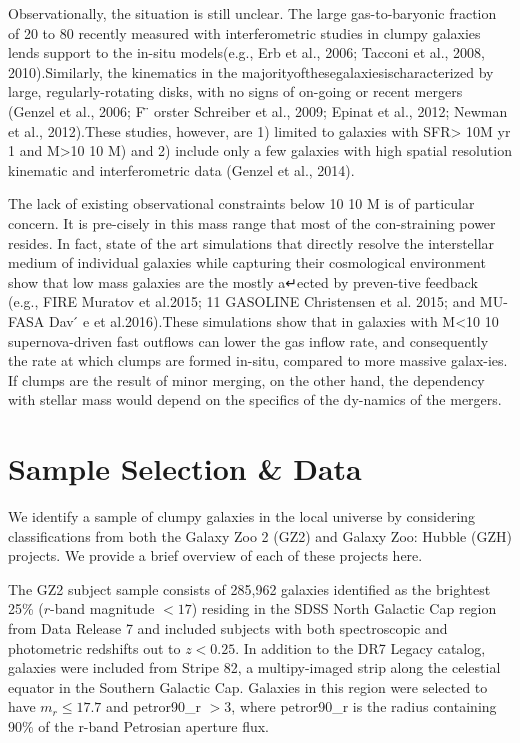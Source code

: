 Observationally, the situation is still unclear. The large gas-to-baryonic fraction of 20 to 80 recently measured with interferometric studies in clumpy galaxies lends support to the in-situ models(e.g., Erb et al., 2006; Tacconi et al., 2008, 2010).Similarly, the kinematics in the majorityofthesegalaxiesischaracterized by large, regularly-rotating disks, with no signs of on-going or recent mergers (Genzel et al., 2006; F ̈ orster Schreiber et al., 2009; Epinat et al., 2012; Newman et al., 2012).These studies, however, are 1) limited to galaxies with SFR> 10M yr 1 and M>10 10 M) and 2) include only a few galaxies with high spatial resolution kinematic and interferometric data (Genzel et al., 2014). 

The lack of existing observational constraints below 10 10 M is of particular concern. It is pre-cisely in this mass range that most of the con-straining power resides. In fact, state of the art simulations that directly resolve the interstellar medium of individual galaxies while capturing their cosmological environment show that low mass galaxies are the mostly a↵ected by preven-tive feedback (e.g., FIRE Muratov et al.2015; 11
GASOLINE Christensen et al. 2015; and MU-FASA Dav ́ e et al.2016).These simulations show that in galaxies with M<10 10 supernova-driven fast outflows can lower the gas inflow rate, and consequently the rate at which clumps are formed in-situ, compared to more massive galax-ies. If clumps are the result of minor merging, on the other hand, the dependency with stellar mass would depend on the specifics of the dy-namics of the mergers. 

\section{Sample Selection \& Data} \label{sec:chap5-sample}
We identify a sample of clumpy galaxies in the local universe by considering classifications from both the Galaxy Zoo 2 (GZ2) \citep{Willett2013} and Galaxy Zoo: Hubble (GZH) \citep{Willett2017} projects. We provide a brief overview of each of these projects here. 

The GZ2 subject sample consists of 285,962 galaxies identified as the brightest 25\% ($r$-band magnitude $< 17$) residing in the SDSS North Galactic Cap region from Data Release 7 and included subjects with both spectroscopic and photometric redshifts out to $z < 0.25$. In addition to the DR7 Legacy catalog, galaxies were included from Stripe 82, a multipy-imaged strip along the celestial equator in the Southern Galactic Cap. Galaxies in this region were selected to have $m_r\le17.7$ and petror90\_r $>3$, where petror90\_r is the radius containing 90\% of the r-band Petrosian aperture flux.

